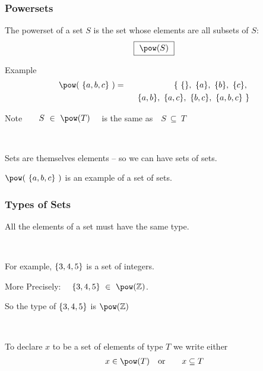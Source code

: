 \documentclass{beamer}
\begin{document}
\begin{frame}
\frametitle{Powersets}

The \alert{powerset}  of a set $S$ is the set whose elements are all subsets of $S$:
\begin{eqnarray*}
\fbox{~$
    \power(S)  
~$}
\end{eqnarray*}

Example
\begin{eqnarray*}
    \power(~\set{a,b,c}~) &=&
    \set{~ \set{},~ \set{a},~ \set{b},~ \set{c},~\\ &&~~
     \set{a,b},~ \set{a,c},~ \set{b,c},~ \set{a,b,c} ~}
\end{eqnarray*}



Note$~~~~~~
    S ~\in~ \pow(T)
~~~$ \alert{is the same as} $~~~
    S ~\subseteq~ T
$

~

Sets are themselves  elements -- so we can have \alert{sets of sets}.

$\power(~\set{a,b,c}~)$ is an example of a set of sets.



\end{frame}





\begin{frame}
\frametitle{Types of Sets}

All the elements of a set must have the same type.

~

For example, $\{3,4,5\}$ is a set of integers.

More Precisely:~~ $\set{3,4,5} ~\in~ \power(\mathbb{Z})$.


So the type of $\{3,4,5\}$ is $\power(\mathbb{Z})$

~

To declare $x$ to be a set of elements of type $T$ we write either
\begin{eqnarray*}
    x \in \power(T)  &~~~\mbox{or}~~~&
    x \subseteq T
\end{eqnarray*}






\end{frame}
\end{document}
